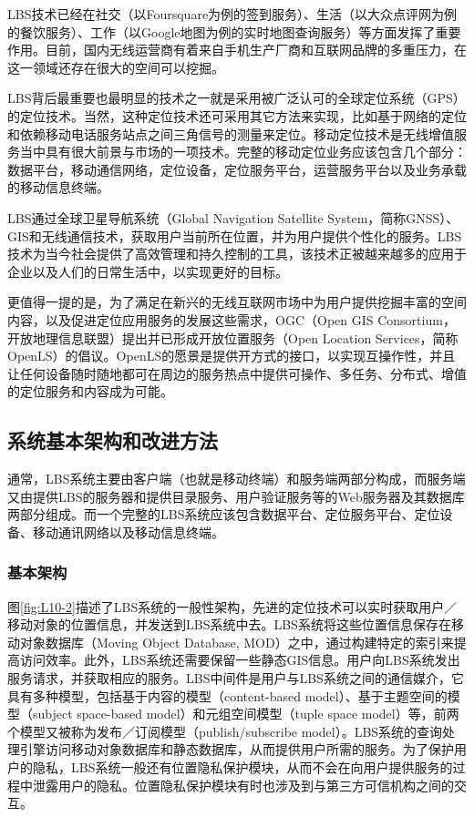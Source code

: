 \documentclass{article}
\begin{document}
\begin{CJK}{UTF8}{gbsn}
	LBS技术已经在社交（以Foursquare为例的签到服务）、生活（以大众点评网为例的餐饮服务）、工作（以Google地图为例的实时地图查询服务）等方面发挥了重要作用。目前，国内无线运营商有着来自手机生产厂商和互联网品牌的多重压力，在这一领域还存在很大的空间可以挖掘。

  LBS背后最重要也最明显的技术之一就是采用被广泛认可的全球定位系统（GPS）的定位技术。当然，这种定位技术还可采用其它方法来实现，比如基于网络的定位和依赖移动电话服务站点之间三角信号的测量来定位\cite{L01}。移动定位技术是无线增值服务当中具有很大前景与市场的一项技术。完整的移动定位业务应该包含几个部分：数据平台，移动通信网络，定位设备，定位服务平台，运营服务平台以及业务承载的移动信息终端\cite{L07}。

  LBS通过全球卫星导航系统（Global Navigation Satellite System，简称GNSS）、GIS和无线通信技术，获取用户当前所在位置，并为用户提供个性化的服务。LBS技术为当今社会提供了高效管理和持久控制的工具，该技术正被越来越多的应用于企业以及人们的日常生活中，以实现更好的目标\cite{L01}。

  更值得一提的是，为了满足在新兴的无线互联网市场中为用户提供挖掘丰富的空间内容，以及促进定位应用服务的发展这些需求，OGC（Open GIS Consortium，开放地理信息联盟）提出并已形成开放位置服务（Open Location Services，简称OpenLS）的倡议。OpenLS的愿景是提供开方式的接口，以实现互操作性，并且让任何设备随时随地都可在周边的服务热点中提供可操作、多任务、分布式、增值的定位服务和内容成为可能\cite{L13}。

	\subsection{系统基本架构和改进方法}
	通常，LBS系统主要由客户端（也就是移动终端）和服务端两部分构成，而服务端又由提供LBS的服务器和提供目录服务、用户验证服务等的Web服务器及其数据库两部分组成。而一个完整的LBS系统应该包含数据平台、定位服务平台、定位设备、移动通讯网络以及移动信息终端。

	\subsubsection{基本架构}
  图\ref{fig:L10-2}描述了LBS系统的一般性架构，先进的定位技术可以实时获取用户／移动对象的位置信息，并发送到LBS系统中去\cite{L10}。LBS系统将这些位置信息保存在移动对象数据库（Moving Object Database, MOD）之中，通过构建特定的索引来提高访问效率。此外，LBS系统还需要保留一些静态GIS信息。用户向LBS系统发出服务请求，并获取相应的服务。LBS中间件是用户与LBS系统之间的通信媒介，它具有多种模型，包括基于内容的模型（content-based model）、基于主题空间的模型（subject space-based model）和元组空间模型（tuple space model）等，前两个模型又被称为发布／订阅模型（publish/subscribe model）\cite{L10}。LBS系统的查询处理引擎访问移动对象数据库和静态数据库，从而提供用户所需的服务。为了保护用户的隐私，LBS系统一般还有位置隐私保护模块，从而不会在向用户提供服务的过程中泄露用户的隐私。位置隐私保护模块有时也涉及到与第三方可信机构之间的交互。


\end{CJK}
\end{document}
